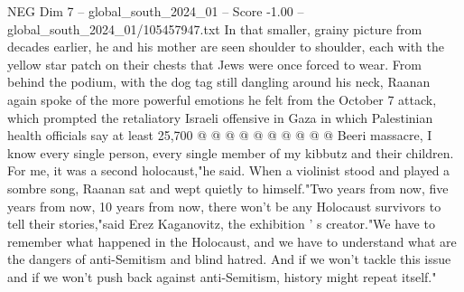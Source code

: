\begin{textsample}{NEG Dim 7 – global\_south\_2024\_01 – Score -1.00 – global\_south\_2024\_01/105457947.txt}
In that smaller, grainy picture from decades earlier, he and his mother are seen shoulder to shoulder, each with the yellow star patch on their chests that Jews were once forced to wear.
From behind the podium, with the dog tag still dangling around his neck, Raanan again spoke of the more powerful emotions he felt from the October 7 attack, which prompted the retaliatory Israeli offensive in Gaza in which Palestinian health officials say at least 25,700 @ @ @ @ @ @ @ @ @ @ Beeri massacre, I know every single person, every single member of my kibbutz and their children.
For me, it was a second holocaust,"he said.
When a violinist stood and played a sombre song, Raanan sat and wept quietly to himself."Two years from now, five years from now, 10 years from now, there won't be any Holocaust survivors to tell their stories,"said Erez Kaganovitz, the exhibition ' s creator."We have to remember what happened in the Holocaust, and we have to understand what are the dangers of anti-Semitism and blind hatred.
And if we won't tackle this issue and if we won't push back against anti-Semitism, history might repeat itself."

\end{textsample}
